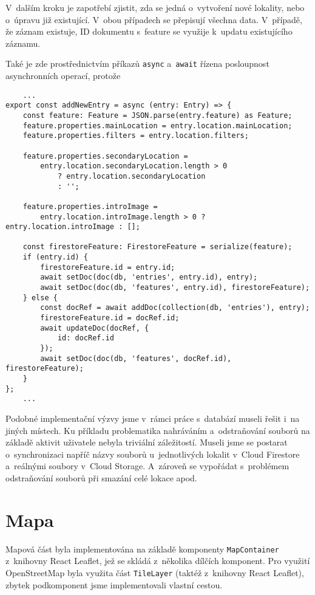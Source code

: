 V~dalším kroku je zapotřebí zjistit, zda se jedná o~vytvoření nové lokality, nebo o~úpravu již existující. V~obou případech se přepisují všechna data. V~případě, že záznam existuje, ID dokumentu s~feature se využije k~updatu existujícího záznamu.

Také je zde prostřednictvím příkazů \verb|async| a~\verb|await| řízena posloupnost asynchronních operací, protože

\begin{verbatim}
    ...
export const addNewEntry = async (entry: Entry) => {
    const feature: Feature = JSON.parse(entry.feature) as Feature;
    feature.properties.mainLocation = entry.location.mainLocation;
    feature.properties.filters = entry.location.filters;

    feature.properties.secondaryLocation =
        entry.location.secondaryLocation.length > 0
            ? entry.location.secondaryLocation
            : '';

    feature.properties.introImage =
        entry.location.introImage.length > 0 ? entry.location.introImage : [];

    const firestoreFeature: FirestoreFeature = serialize(feature);
    if (entry.id) {
        firestoreFeature.id = entry.id;
        await setDoc(doc(db, 'entries', entry.id), entry);
        await setDoc(doc(db, 'features', entry.id), firestoreFeature);
    } else {
        const docRef = await addDoc(collection(db, 'entries'), entry);
        firestoreFeature.id = docRef.id;
        await updateDoc(docRef, {
            id: docRef.id
        });
        await setDoc(doc(db, 'features', docRef.id), firestoreFeature);
    }
};
    ...
    \end{verbatim}

Podobné implementační výzvy jsme v~rámci práce s~databází museli řešit i~na jiných místech. Ku příkladu problematika nahráváním a~odstraňování souborů na základě aktivit uživatele nebyla triviální záležitostí. Museli jsme se postarat o~synchronizaci napříč názvy souborů u~jednotlivých lokalit v~Cloud Firestore a~reálnými soubory v~Cloud Storage. A~zároveň se vypořádat s~problémem odstraňování souborů při smazání celé lokace apod.

\hypertarget{mapa}{%
\section{Mapa}\label{mapa}}

Mapová část byla implementována na základě komponenty \verb|MapContainer| z~knihovny React Leaflet, jež se skládá z~několika dílčích komponent. Pro využití OpenStreetMap byla využita část \verb|TileLayer| (taktéž z~knihovny React Leaflet), zbytek podkomponent jsme implementovali vlastní cestou.

